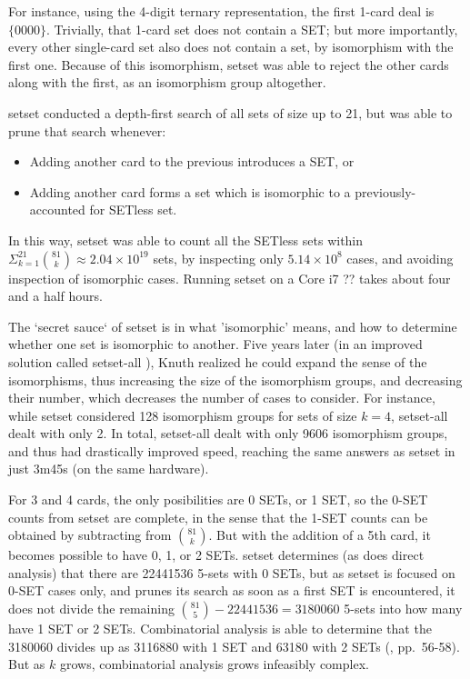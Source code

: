 \documentclass[10pt]{amsart}
\newcommand{\SETSET}{  {\sc setset} }
\newcommand{\SETSETA}{ {\sc setset-all} }
\begin{document}
For instance, using the 4-digit ternary representation, the first 1-card deal is
$\{0000\}$. Trivially, that 1-card set does not contain a SET; but more
importantly, every other single-card set also does not contain a set, by
isomorphism with the first one. Because of this isomorphism, \SETSET was able to reject the other cards along with the first, as an isomorphism group altogether.

\SETSET conducted a depth-first search of all sets of size up to 21, but was
able to prune that search whenever:
\begin{itemize}
\item Adding another card to the previous introduces a SET, or
\item Adding another card forms a set which is isomorphic to a
  previously-accounted for SETless set.
\end{itemize}
In this way, \SETSET was able to count all the SETless sets within
$\Sigma_{k=1}^{21}\binom{81}{k}\approx 2.04\times 10^{19}$ sets, by inspecting
only $5.14\times 10^8$ cases, and avoiding inspection of isomorphic
cases. Running \SETSET on a Core i7 ?? takes about four and a half hours.

The `secret sauce` of \SETSET is in what 'isomorphic' means, and how to
determine whether one set is isomorphic to another. Five years later (in an
improved solution called \SETSETA \cite{SETSET-ALL}), Knuth realized he could
expand the sense of the isomorphisms, thus increasing the size of the
isomorphism groups, and decreasing their number, which decreases the number of
cases to consider. For instance, while \SETSET considered 128 isomorphism groups
for sets of size $k=4$, \SETSETA dealt with only 2. In total, \SETSETA dealt
with only 9606 isomorphism groups, and thus had drastically improved speed,
reaching the same answers as \SETSET in just 3m45s (on the same hardware).

For 3 and 4 cards, the only posibilities are 0 SETs, or 1 SET, so the 0-SET
counts from \SETSET are complete, in the sense that the 1-SET counts can be
obtained by subtracting from $\binom{81}{k}$. But with the addition of a 5th
card, it becomes possible to have 0, 1, or 2 SETs. \SETSET determines (as does
direct analysis) that there are 22441536 5-sets with 0 SETs, but as \SETSET is
focused on 0-SET cases only, and prunes its search as soon as a first SET is
encountered, it does not divide the remaining $\binom{81}{5}-22441536=3180060$
5-sets into how many have 1 SET or 2 SETs. Combinatorial analysis is able to
determine that the 3180060 divides up as 3116880 with 1 SET and 63180 with 2
SETs (\cite{JOS}, pp.~56-58). But as $k$ grows, combinatorial analysis grows
infeasibly complex.
\end{document}
